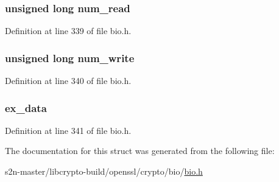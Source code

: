 \subsubsection[{\texorpdfstring{num\+\_\+read}{num_read}}]{\setlength{\rightskip}{0pt plus 5cm}unsigned long num\+\_\+read}\hypertarget{structbio__st_a89f96b6ee80e1bafdc50124e75f166d8}{}\label{structbio__st_a89f96b6ee80e1bafdc50124e75f166d8}


Definition at line 339 of file bio.\+h.

\subsubsection[{\texorpdfstring{num\+\_\+write}{num_write}}]{\setlength{\rightskip}{0pt plus 5cm}unsigned long num\+\_\+write}\hypertarget{structbio__st_ae4c6903657e3e0bd66543a960bfbf881}{}\label{structbio__st_ae4c6903657e3e0bd66543a960bfbf881}


Definition at line 340 of file bio.\+h.

\subsubsection[{\texorpdfstring{ex\+\_\+data}{ex_data}}]{ ex\+\_\+data}\hypertarget{structbio__st_ac3e4fd59d6ee44a81f3a58114613c1e2}{}\label{structbio__st_ac3e4fd59d6ee44a81f3a58114613c1e2}


Definition at line 341 of file bio.\+h.



The documentation for this struct was generated from the following file\+:\begin{DoxyCompactItemize}
\item 
s2n-\/master/libcrypto-\/build/openssl/crypto/bio/\hyperlink{crypto_2bio_2bio_8h}{bio.\+h}\end{DoxyCompactItemize}

